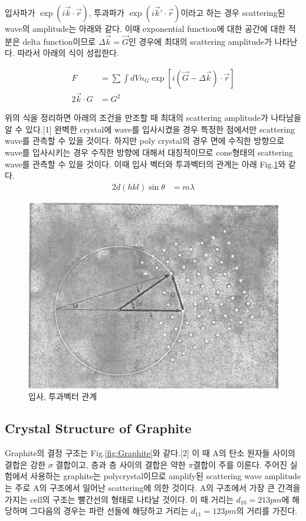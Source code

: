\documentclass[%
 reprint,
 amsmath,amssymb,
 aps,
]{revtex4-2}
\begin{document}
입사파가 $\exp(i\vec{k}\cdot\vec{r})$, 투과파가 $\exp(i\vec{k}'\cdot\vec{r})$이라고 하는 경우 scattering된 wave의 amplitude는 아래와 같다. 이때 exponential function에 대한 공간에 대한 적분은 delta function이므로 $\Delta\vec{k} = \vec{G}$인 경우에 최대의 scattering amplitude가 나타난다. 따라서 아래의 식이 성립한다.

\begin{align}
	F &= \sum \int dV n_{G}\exp[i(\vec{G}-\Delta\vec{k})\cdot \vec{r}]\\
	2\vec{k}\cdot{G} &= G^{2}
\end{align}

위의 식을 정리하면 아래의 조건을 만조할 때 최대의 scattering amplitude가 나타남을 알 수 있다.[1] 완벽한 crystal에 wave를 입사시켰을 경우 특정한 점에서만 scattering wave를 관측할 수 있을 것이다. 하지만 poly crystal의 경우 면에 수직한 방향으로 wave를 입사시키는 경우 수직한 방향에 대해서 대칭적이므로 cone형태의 scattering wave를 관측할 수 있을 것이다. 이때 입사 벡터와 투과벡터의 관계는 아래 Fig.\ref{fig:KITTEL}와 같다.
\begin{align}
	2d(hkl) \sin \theta &= m\lambda \label{eq:wave_eq}
\end{align}
\begin{figure}[htbp]
	\includegraphics[width = 0.85\linewidth]{KITTEL.png}%
	\caption{\label{fig:KITTEL}입사, 투과벡터 관계}
\end{figure}

\subsection{\label{sec:level2}Crystal Structure of Graphite}
Graphite의 결정 구조는 Fig.\ref{fig:Graphite}와 같다.[2] 이 때 A의 탄소 원자들 사이의 결합은 강한 $\sigma$ 결합이고, 층과 층 사이의 결합은 약한 $\pi$결합이 주를 이룬다. 주어진 실험에서 사용하는 graphite는 polycrystal이므로 amplify된 scattering wave amplitude는 주로 A의 구조에서 일어난 scattering에 의한 것이다. A의 구조에서 가장 큰 간격을 가지는 cell의 구조는 빨간선의 형태로 나타날 것이다. 이 때 거리는 $d_{10} = 213pm$에 해당하며 그다음의 경우는 파란 선들에 해당하고 거리는 $d_{11} = 123pm$의 거리를 가진다.
\end{document}
